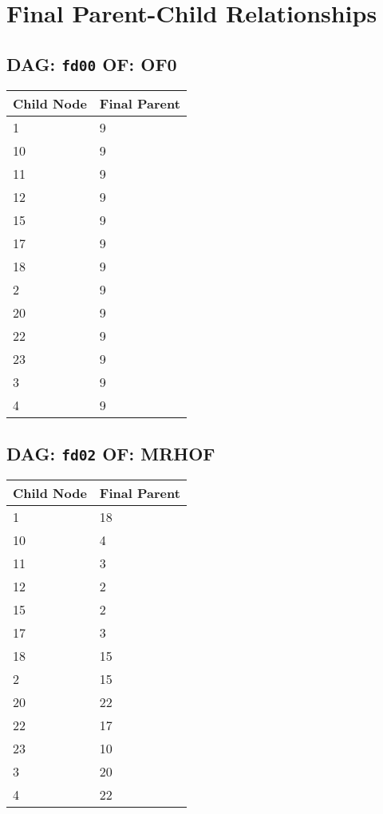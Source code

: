 \documentclass{article}
\begin{document}
\pagestyle{fancy}
\fancyhf{}
\section*{Final Parent-Child Relationships}
\subsection*{DAG: \texttt{fd00} OF: OF0}
\begin{tabular}{ll}
\toprule
\textbf{Child Node} & \textbf{Final Parent} \\
\midrule
1 & 9 \\
10 & 9 \\
11 & 9 \\
12 & 9 \\
15 & 9 \\
17 & 9 \\
18 & 9 \\
2 & 9 \\
20 & 9 \\
22 & 9 \\
23 & 9 \\
3 & 9 \\
4 & 9 \\
\bottomrule
\end{tabular}

\subsection*{DAG: \texttt{fd02} OF: MRHOF}
\begin{tabular}{ll}
\toprule
\textbf{Child Node} & \textbf{Final Parent} \\
\midrule
1 & 18 \\
10 & 4 \\
11 & 3 \\
12 & 2 \\
15 & 2 \\
17 & 3 \\
18 & 15 \\
2 & 15 \\
20 & 22 \\
22 & 17 \\
23 & 10 \\
3 & 20 \\
4 & 22 \\
\bottomrule
\end{tabular}
\end{document}
